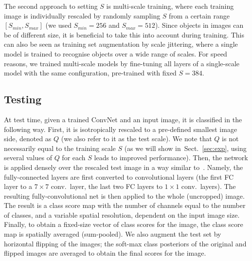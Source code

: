 \documentclass{article} %
\newcommand{\sref}[1]{Sect.~\ref{#1}}
\begin{document}
The second approach to setting $S$ is multi-scale training, where each training image is individually rescaled by randomly sampling $S$ from a certain range $\left[S_{min},S_{max}\right]$ (we used $S_{min}=256$ and $S_{max}=512$). 
Since objects in images can be of different size, it is beneficial to take this into account during training.
This can also be seen as training set augmentation by scale jittering, where a single model is trained to recognise objects over a wide range of scales.
For speed reasons, we trained multi-scale models by fine-tuning all layers of a single-scale model with the same configuration, pre-trained with fixed $S=384$.

\subsection{Testing}
\label{sec:test}
At test time, given a trained ConvNet and an input image, it is classified in the following way. 
First, it is isotropically rescaled to a pre-defined smallest image side, denoted as $Q$ (we also refer to it as the test scale).
We note that $Q$ is not necessarily equal to the training scale $S$ (as we will show in~\sref{sec:exp},
using several values of $Q$ for each $S$ leads to improved performance).
Then, the network is applied densely over the rescaled test image in a way similar to~\citep{Sermanet14}. Namely, the fully-connected layers are first converted to convolutional layers (the first FC layer to a $7\times7$ conv.\ layer, the last two FC layers to $1\times1$ conv.\ layers). The resulting fully-convolutional net is then applied to the whole (uncropped) image.
The result is a class score map with the number of channels equal to the number of classes, and a variable spatial resolution, dependent
on the input image size. Finally, to obtain a fixed-size vector of class scores for the image, the class score map is spatially averaged (sum-pooled).
We also augment the test set by horizontal flipping of the images; the soft-max class posteriors of the original and flipped images are averaged to obtain
the final scores for the image.
\end{document}
